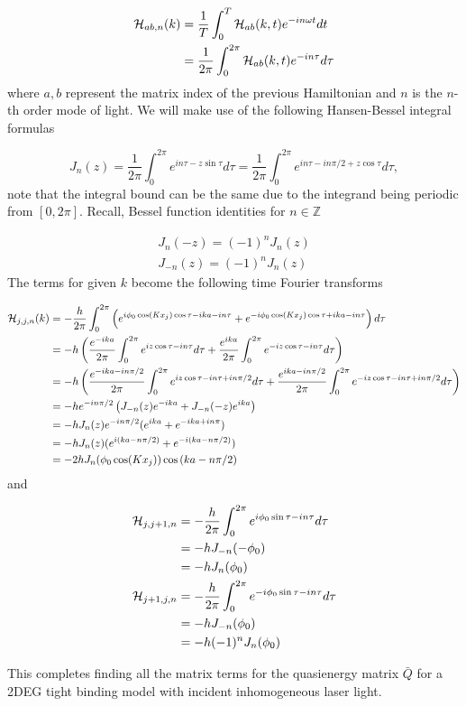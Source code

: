 \begin{align}
  \mathcal{H}_{ab,n}(k) &= \dfrac{1}{T} \int_0^T \mathcal{H}_{ab}(k,t) e^{-in \omega t} dt \\
  &= \dfrac{1}{2\pi} \int_0^{2\pi} \mathcal{H}_{ab}(k,t) e^{-in\tau} d\tau
\end{align}
where $a,b$ represent the matrix index of the previous Hamiltonian and $n$ is the $n$-th order mode of light.
We will make use of the following Hansen-Bessel integral formulas

\begin{equation} \label{eq: hansen-bessel}
  J_n(z) = \dfrac{1}{2\pi} \int_0^{2\pi} e^{in\tau - z \sin\tau} d\tau = \dfrac{1}{2\pi} \int_0^{2\pi} e^{in\tau - in\pi/2 + z\cos\tau} d\tau,
\end{equation}
note that the integral bound can be the same due to the integrand being periodic from $[0,2\pi]$.
Recall, Bessel function identities for $n \in \mathbb{Z}$

\begin{align}
  J_n(-z) = (-1)^n J_n(z) \\
  J_{-n}(z) = (-1)^n J_n(z)
\end{align}
The terms for given $k$ become the following time Fourier transforms

\begin{align}
  \mathcal{H}_{j,j,n}(k) &= -\dfrac{h}{2\pi} \int_0^{2\pi} \left( e^{i \phi_0 \cos(Kx_j) \cos \tau - ika - in\tau} + e^{-i \phi_0 \cos(Kx_j) \cos \tau + ika - in\tau} \right) d\tau \nonumber \\
    &= -h \left( \dfrac{e^{-ika}}{2\pi} \int_0^{2\pi} e^{i z \cos \tau - in\tau} d\tau + \dfrac{e^{ika}}{2\pi} \int_0^{2\pi} e^{-i z \cos \tau - in\tau} d\tau \right) \nonumber \\
    &= -h \left( \dfrac{e^{-ika -in\pi/2}}{2\pi} \int_0^{2\pi} e^{i z \cos \tau - in\tau + in\pi/2} d\tau + \dfrac{e^{ika - in\pi/2}}{2\pi} \int_0^{2\pi} e^{-i z \cos \tau - in\tau + in\pi/2} d\tau \right) \nonumber \\
    &= -h e^{-in\pi/2} \left( J_{-n}(z) e^{-ika} + J_{-n}(-z) e^{ika} \right) \nonumber \\
    &= -h J_n(z) e^{-in\pi/2} ( e^{ika} +  e^{-ika+in\pi} ) \nonumber \\
    &= -h J_n(z) ( e^{i(ka-n\pi/2)} +  e^{-i(ka-n\pi/2)} ) \nonumber \\
    &= -2h J_n(\phi_0 \cos(Kx_j)) \cos \left( ka -n\pi/2 \right)
\end{align}
and

\begin{align}
  \mathcal{H}_{j,j+1,n} &= -\dfrac{h}{2\pi} \int_0^{2\pi} e^{i \phi_0 \sin \tau - in\tau} d\tau \nonumber \\
  &= -h J_{-n}(-\phi_0) \nonumber \\
  &= -h J_n(\phi_0) \\
  \mathcal{H}_{j+1,j,n} &= -\dfrac{h}{2\pi} \int_0^{2\pi} e^{-i \phi_0 \sin \tau - in\tau} d\tau \nonumber \\
    &= -h J_{-n}(\phi_0) \nonumber \\
    &= -h (-1)^n J_n(\phi_0)
\end{align}

This completes finding all the matrix terms for the quasienergy matrix $\bar{Q}$ for a 2DEG tight binding model with incident inhomogeneous laser light.



